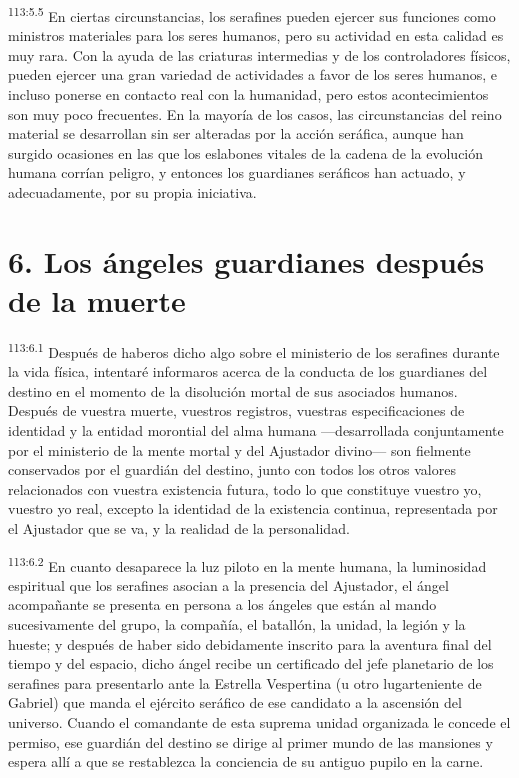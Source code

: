 \par
\textsuperscript{113:5.5} En ciertas circunstancias, los serafines pueden ejercer sus funciones como ministros materiales para los seres humanos, pero su actividad en esta calidad es muy rara. Con la ayuda de las criaturas intermedias y de los controladores físicos, pueden ejercer una gran variedad de actividades a favor de los seres humanos, e incluso ponerse en contacto real con la humanidad, pero estos acontecimientos son muy poco frecuentes. En la mayoría de los casos, las circunstancias del reino material se desarrollan sin ser alteradas por la acción seráfica, aunque han surgido ocasiones en las que los eslabones vitales de la cadena de la evolución humana corrían peligro, y entonces los guardianes seráficos han actuado, y adecuadamente, por su propia iniciativa.

\section*{6. Los ángeles guardianes después de la muerte}
\par
\textsuperscript{113:6.1} Después de haberos dicho algo sobre el ministerio de los serafines durante la vida física, intentaré informaros acerca de la conducta de los guardianes del destino en el momento de la disolución mortal de sus asociados humanos. Después de vuestra muerte, vuestros registros, vuestras especificaciones de identidad y la entidad morontial del alma humana ---desarrollada conjuntamente por el ministerio de la mente mortal y del Ajustador divino--- son fielmente conservados por el guardián del destino, junto con todos los otros valores relacionados con vuestra existencia futura, todo lo que constituye vuestro yo, vuestro yo real, excepto la identidad de la existencia continua, representada por el Ajustador que se va, y la realidad de la personalidad.

\par
\textsuperscript{113:6.2} En cuanto desaparece la luz piloto en la mente humana, la luminosidad espiritual que los serafines asocian a la presencia del Ajustador, el ángel acompañante se presenta en persona a los ángeles que están al mando sucesivamente del grupo, la compañía, el batallón, la unidad, la legión y la hueste; y después de haber sido debidamente inscrito para la aventura final del tiempo y del espacio, dicho ángel recibe un certificado del jefe planetario de los serafines para presentarlo ante la Estrella Vespertina (u otro lugarteniente de Gabriel) que manda el ejército seráfico de ese candidato a la ascensión del universo. Cuando el comandante de esta suprema unidad organizada le concede el permiso, ese guardián del destino se dirige al primer mundo de las mansiones y espera allí a que se restablezca la conciencia de su antiguo pupilo en la carne.

